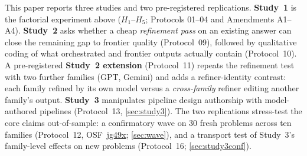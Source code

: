 \documentclass[12pt,a4paper]{article}
\begin{document}
This paper reports three studies and two pre-registered replications.
\textbf{Study~1} is the factorial experiment above ($H_1$--$H_5$; Protocols
01--04 and Amendments A1--A4). \textbf{Study~2} asks whether a cheap
\emph{refinement pass} on an existing answer can close the remaining gap to
frontier quality (Protocol~09), followed by qualitative coding of what
orchestrated and frontier outputs actually contain (Protocol~10). A
pre-registered \textbf{Study~2 extension} (Protocol~11) repeats the refinement
test with two further families (GPT, Gemini) and adds a refiner-identity
contrast: each family refined by its own model versus a \emph{cross-family}
refiner editing another family's output. \textbf{Study~3}
manipulates pipeline design authorship with model-authored pipelines
(Protocol~13, \cref{sec:study3}). The two replications stress-test the core
claims out-of-sample: a confirmatory wave on 30 fresh problems across ten
families (Protocol~12, OSF~\href{https://osf.io/jg49x}{jg49x};
\cref{sec:wave}), and a transport test of Study~3's family-level effects on
new problems (Protocol~16; \cref{sec:study3conf}).
\end{document}
